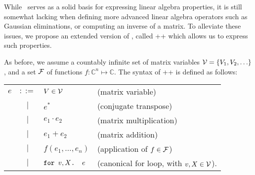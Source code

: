 


While \lang\ serves as a solid basis for expressing linear algebra properties, it is still somewhat lacking when defining more advanced linear algebra operators such as Gaussian eliminations, or computing an inverse of a matrix. To alleviate these issues, we propose an extended version of \lang, called \lang++ which allows us to express such properties.

As before, we assume a countably infinite set of matrix variables $\mathcal{V} = \{V_1, V_2, \ldots\}$, and a set $\mathcal{F}$  of functions $f:\mathbb{C}^n \mapsto \mathbb{C}$. The syntax of \lang++ is defined as follows:


\medskip

\begin{tabular}{lcll}
$e$ & $::=$ & $V\in \mathcal{V}$ & (matrix variable)\\
 & $|$ & $e^*$ & (conjugate transpose)\\ 
 & $|$ & $e_1 \cdot e_2$ & (matrix multiplication)\\   
 & $|$ & $e_1 + e_2$ & (matrix addition)\\    
 & $|$ & $f(e_1,\ldots ,e_n)$ & (application of $f\in \mathcal{F}$)\\
 & $|$ & $\texttt{for }v,X \texttt{. }e$ & (canonical for loop, with $v, X \in \mathcal{V}$). 
\end{tabular}

